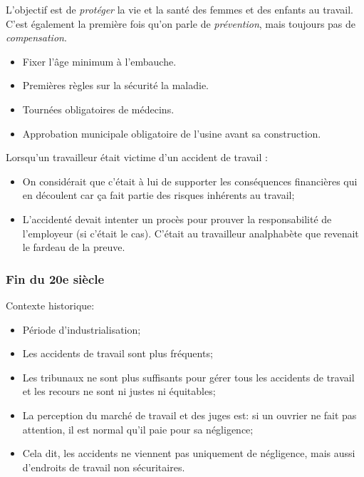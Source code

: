 \documentclass[10pt, french]{article}
\begin{document}
\begin{multicols*}{3}
\begin{rappel_enhanced}
L’objectif est de \textit{protéger} la vie et la santé des femmes et des enfants au travail. C'est également la première fois qu'on parle de \textit{prévention}, mais toujours pas de \textit{compensation}.
\begin{itemize}[leftmargin = *]
	\item	Fixer l'âge minimum à l'embauche.
	\item	Premières règles sur la sécurité la maladie.
	\item	Tournées obligatoires de médecins.
	\item	Approbation municipale obligatoire de l'usine avant sa construction.
\end{itemize}
\end{rappel_enhanced}

Lorsqu'un travailleur était victime d'un accident de travail :
\begin{itemize}
\item On considérait que c'était à lui de supporter les conséquences financières qui en découlent car ça fait partie des risques inhérents au travail;
\item L'accidenté devait intenter un procès pour prouver la responsabilité de l'employeur (si c'était le cas). C'était au travailleur analphabète que revenait le fardeau de la preuve.
\end{itemize}

\subsubsection*{Fin du 20e siècle}

Contexte historique:
\begin{itemize}[leftmargin = *]
	\item	Période d'industrialisation;
	\item	Les accidents de travail sont plus fréquents;
	\item	Les tribunaux ne sont plus suffisants pour gérer tous les accidents de travail et les recours ne sont ni justes ni équitables;
	\item	La perception du marché de travail et des juges est: si un ouvrier ne fait pas attention, il est normal qu'il paie pour sa négligence;
	\item	Cela dit, les accidents ne viennent pas uniquement de négligence, mais aussi d'endroits de travail non sécuritaires.
\end{itemize}


\end{multicols*}
\end{document}
